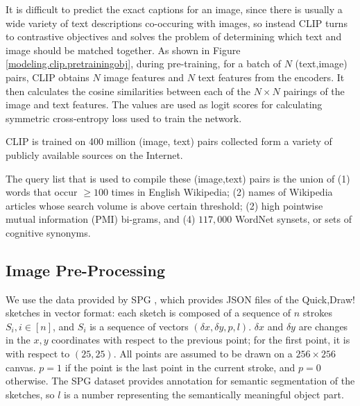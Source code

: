 It is difficult to predict the exact captions for an image, since there is usually a wide variety of text descriptions co-occuring with images, so instead CLIP turns to contrastive objectives and solves the problem of determining which text and image should be matched together. 
As shown in Figure \ref{modeling.clip.pretrainingobj}, during pre-training, for a batch of $N$ (text,image) pairs, CLIP obtains $N$ image features and $N$ text features from the encoders. It then calculates the cosine similarities between each of the $N \times N$ pairings of the image and text features. The values are used as logit scores for calculating symmetric cross-entropy loss used to train the network.      


CLIP is trained on 400 million (image, text) pairs collected form a variety of publicly available sources on the Internet.

The query list that is used to compile these (image,text) pairs is the union of (1) words that occur $\geq 100$ times in English Wikipedia; (2) names of Wikipedia articles whose search volume is above certain threshold; (2) high pointwise mutual information (PMI) bi-grams, and (4) $117,000$ WordNet synsets, or sets of cognitive synonyms. 

\subsection{Image Pre-Processing}
We use the data provided by SPG \citep{spg_paper}, which provides JSON files of the Quick,Draw! sketches in vector format: each sketch is composed of a sequence of $n$ strokes $S_i, i \in [n]$, and $S_i$ is a sequence of vectors $(\delta x,\delta y, p, l)$. $\delta x$ and $\delta y$ are changes in the $x,y$ coordinates with respect to the previous point; for the first point, it is with respect to $(25,25)$. All points are assumed to be drawn on a $256 \times 256$ canvas. $p=1$ if the point is the last point in the current stroke, and $p=0$ otherwise. The SPG dataset provides annotation for semantic segmentation of the sketches, so $l$ is a number representing the semantically meaningful object part.  


